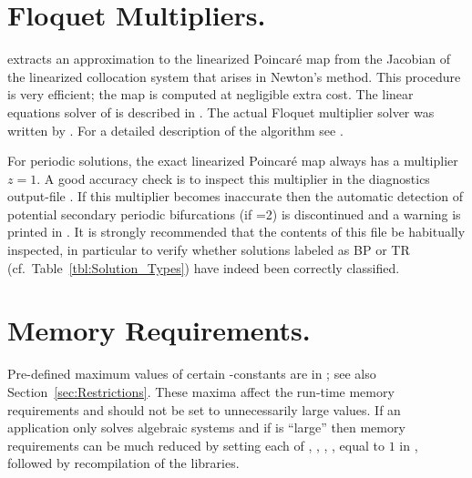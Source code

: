 \section{ Floquet Multipliers.} \label{sec:Floquet_multipliers}

\AUTO extracts an approximation to the linearized Poincar\'e map from 
the Jacobian of the linearized collocation system that arises in Newton's method.
This procedure is very efficient; the map is computed at negligible extra cost.
The linear equations solver of \AUTO is described in 
 \citeyear{DoKeKe:91b}.
The actual Floquet multiplier solver was written by
 \citeyear{Fa:94}.
For a detailed description of the algorithm see 
 \citeyear{FaJe:91}.

For periodic solutions, the exact linearized Poincar\'e map always has 
a multiplier $z=1$.
A good accuracy check is to inspect this 
multiplier in the diagnostics output-file .
If this multiplier becomes inaccurate then the automatic detection 
of potential secondary periodic bifurcations (if =2) is discontinued 
and a warning is printed in .
It is strongly recommended that the contents of this file be habitually inspected,
in particular to verify whether solutions labeled as BP or TR 
(cf.~Table~\ref{tbl:Solution_Types}) have indeed  been correctly classified.
 
\section{ Memory Requirements.} \label{sec:Memory_requirements}
Pre-defined maximum values of certain \AUTO-constants
are in ; 
see also Section~\ref{sec:Restrictions}. 
These maxima affect the run-time memory requirements
and should not be set to unnecessarily large values.
If an application only solves algebraic systems and if  is ``large''
then memory requirements can be much reduced by setting each of
, , , , 
equal to $1$ in ,
followed by recompilation of the \AUTO libraries.

